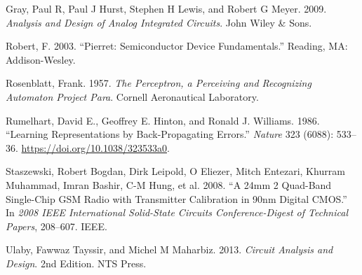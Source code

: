 \documentclass[
  11pt,
  letterpaper,
  abstract]{scrbook}
\newlength{\cslhangindent}
\newenvironment{CSLReferences}[2] %
 {\begin{list}{}{%
  \setlength{\itemindent}{0pt}
  \setlength{\leftmargin}{0pt}
  \setlength{\parsep}{0pt}
  \ifodd #1
   \setlength{\leftmargin}{\cslhangindent}
   \setlength{\itemindent}{-1\cslhangindent}
  \fi
  \setlength{\itemsep}{#2\baselineskip}}}
 {\end{list}}
\begin{document}
\label{refs}
\begin{CSLReferences}{1}{0}
Gray, Paul R, Paul J Hurst, Stephen H Lewis, and Robert G Meyer. 2009.
\emph{Analysis and Design of Analog Integrated Circuits}. John Wiley \&
Sons.

Robert, F. 2003. {``Pierret: Semiconductor Device Fundamentals.''}
Reading, MA: Addison-Wesley.

Rosenblatt, Frank. 1957. \emph{The Perceptron, a Perceiving and
Recognizing Automaton Project Para}. Cornell Aeronautical Laboratory.

Rumelhart, David E., Geoffrey E. Hinton, and Ronald J. Williams. 1986.
{``Learning Representations by Back-Propagating Errors.''} \emph{Nature}
323 (6088): 533--36. \url{https://doi.org/10.1038/323533a0}.

Staszewski, Robert Bogdan, Dirk Leipold, O Eliezer, Mitch Entezari,
Khurram Muhammad, Imran Bashir, C-M Hung, et al. 2008. {``A 24mm 2
Quad-Band Single-Chip GSM Radio with Transmitter Calibration in 90nm
Digital CMOS.''} In \emph{2008 IEEE International Solid-State Circuits
Conference-Digest of Technical Papers}, 208--607. IEEE.

Ulaby, Fawwaz Tayssir, and Michel M Maharbiz. 2013. \emph{Circuit
Analysis and Design}. 2nd Edition. NTS Press.

\end{CSLReferences}


\backmatter
\end{document}
